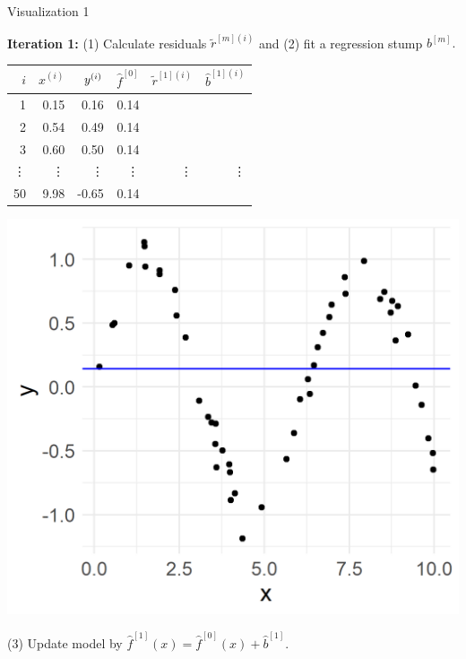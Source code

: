 \begin{vbframe}{Visualization 1}
\begin{footnotesize}
\end{footnotesize}

\framebreak


\begin{footnotesize}
\textbf{Iteration 1:} (1) Calculate residuals $\tilde{r}^{[m](i)}$ and (2) 
fit a regression stump $b^{[m]}.$ %

\vfill

\begin{minipage}[c]{0.5\textwidth}
  \vspace{0pt}%
  \centering
  \scriptsize
  \begin{tabular}{r|r|r|r|r|r}
    $i$ & $x^{(i)}$ & $y^{(i)}$ & $\hat{f}^{[0]}$ & $\tilde{r}^{[1](i)}$ & 
    $\hat{b}^{[1](i)}$\\ 
    \hline
    1 & 0.15 & 0.16 & 0.14 & & \\
    2 & 0.54 & 0.49 & 0.14 & & \\
    3 & 0.60 & 0.50 & 0.14 & & \\
    \vdots & \vdots & \vdots & \vdots & \vdots & \vdots \\
    50 & 9.98 & -0.65 & 0.14 & & \\
  \end{tabular}
\end{minipage}%
\begin{minipage}[c]{0.05\textwidth}
  \phantom{foo}
\end{minipage}%
\begin{minipage}[c]{0.45\textwidth}
  \vspace{0pt}%
  \includegraphics{figure/gbm_anim_init.png}
\end{minipage}%

\vfill

(3) Update model by $\hat{f}^{[1]}(x) = \hat{f}^{[0]}(x) + \hat{b}^{[1]}.$
\end{footnotesize}

\end{vbframe}

